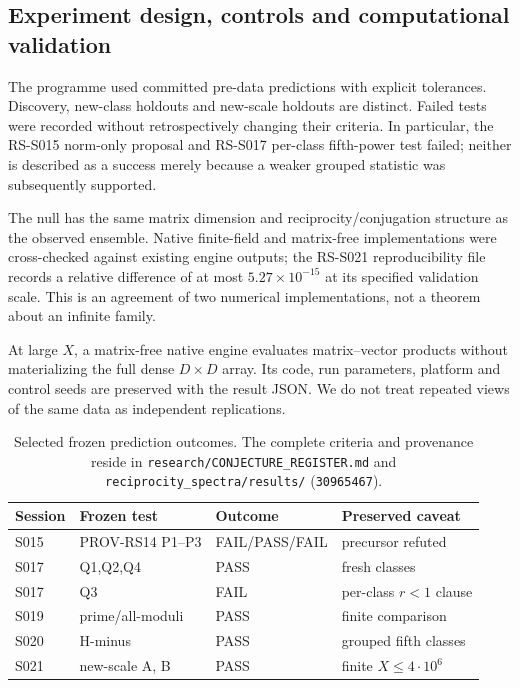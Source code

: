 \subsection{Experiment design, controls and computational validation}
The programme used committed pre-data predictions with explicit
tolerances. Discovery, new-class holdouts and new-scale holdouts
are distinct. Failed tests were recorded without retrospectively
changing their criteria. In particular, the RS-S015
norm-only proposal and RS-S017 per-class fifth-power test failed;
neither is described as a success merely because a weaker
grouped statistic was subsequently supported.

The null has the same matrix dimension and reciprocity/conjugation
structure as the observed ensemble. Native finite-field and
matrix-free implementations were cross-checked against existing
engine outputs; the RS-S021 reproducibility file records a
relative difference of at most \(5.27\times10^{-15}\)
at its specified validation scale.
This is an agreement of two numerical implementations, not a
theorem about an infinite family.

At large \(X\), a matrix-free native engine evaluates matrix--vector
products without materializing the full dense \(D\times D\) array.
Its code, run parameters, platform and control seeds are preserved
with the result JSON. We do not treat repeated views of the same
data as independent replications.


\begin{table}[htbp]\centering\small
\begin{tabular}{@{}llll@{}}\toprule
Session & Frozen test & Outcome & Preserved caveat\\\midrule
S015 & PROV-RS14 P1--P3 & FAIL/PASS/FAIL & precursor refuted\\
S017 & Q1,Q2,Q4 & PASS & fresh classes\\
S017 & Q3 & FAIL & per-class \(r<1\) clause\\
S019 & prime/all-moduli & PASS & finite comparison\\
S020 & H-minus & PASS & grouped fifth classes\\
S021 & new-scale A, B & PASS & finite \(X\le4\cdot10^6\)\\
\bottomrule\end{tabular}
\caption{Selected frozen prediction outcomes. The complete
criteria and provenance reside in
\texttt{research/CONJECTURE\_REGISTER.md} and
\texttt{reciprocity\_spectra/results/} (\texttt{30965467}).}
\label{tab:pred}
\end{table}
